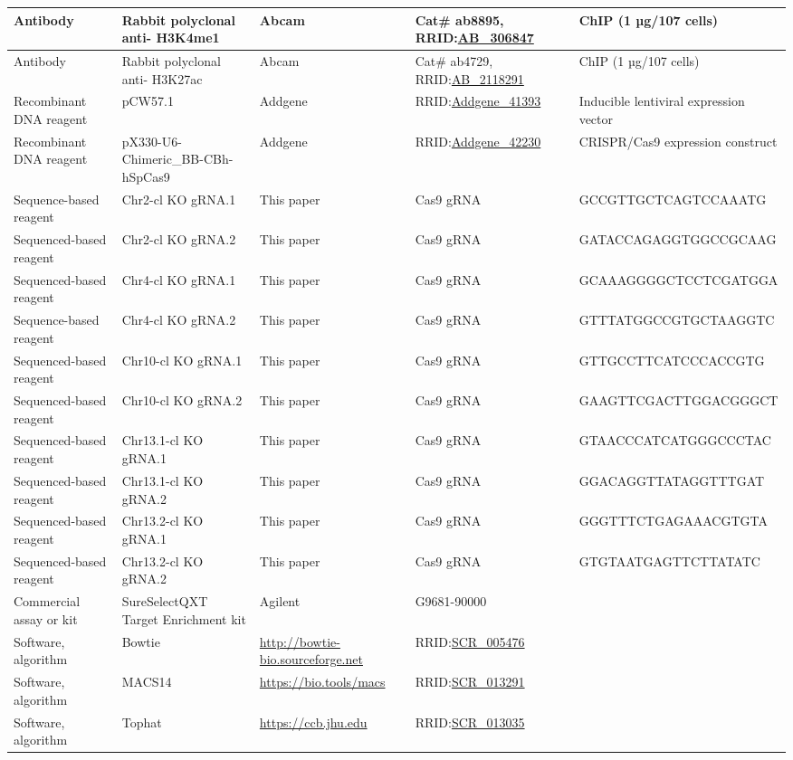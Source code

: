 \documentclass[11pt,a4paper]{article}
\begin{document}
\begin{table}[h]
\begin{tabular}{|l|l|l|l|l|}
Antibody & Rabbit polyclonal anti- H3K4me1 & Abcam & Cat\# ab8895, RRID:\href{https://scicrunch.org/resolver/AB\_306847}{AB\_306847} & ChIP (1 µg/107 cells) \\ \hline
Antibody & Rabbit polyclonal anti- H3K27ac & Abcam & Cat\# ab4729, RRID:\href{https://scicrunch.org/resolver/AB\_2118291}{AB\_2118291} & ChIP (1 µg/107 cells) \\ \hline
Recombinant DNA reagent & pCW57.1 & Addgene & RRID:\href{https://scicrunch.org/resolver/Addgene\_41393}{Addgene\_41393} & Inducible lentiviral expression vector \\ \hline
Recombinant DNA reagent & pX330-U6-Chimeric\_BB-CBh-hSpCas9 & Addgene & RRID:\href{https://scicrunch.org/resolver/Addgene\_42230}{Addgene\_42230} & CRISPR/Cas9 expression construct \\ \hline
Sequence-based reagent & Chr2-cl KO gRNA.1 & This paper & Cas9 gRNA & GCCGTTGCTCAGTCCAAATG \\ \hline
Sequenced-based reagent & Chr2-cl KO gRNA.2 & This paper & Cas9 gRNA & GATACCAGAGGTGGCCGCAAG \\ \hline
Sequenced-based reagent & Chr4-cl KO gRNA.1 & This paper & Cas9 gRNA & GCAAAGGGGCTCCTCGATGGA \\ \hline
Sequence-based reagent & Chr4-cl KO gRNA.2 & This paper & Cas9 gRNA & GTTTATGGCCGTGCTAAGGTC \\ \hline
Sequenced-based reagent & Chr10-cl KO gRNA.1 & This paper & Cas9 gRNA & GTTGCCTTCATCCCACCGTG \\ \hline
Sequenced-based reagent & Chr10-cl KO gRNA.2 & This paper & Cas9 gRNA & GAAGTTCGACTTGGACGGGCT \\ \hline
Sequenced-based reagent & Chr13.1-cl KO gRNA.1 & This paper & Cas9 gRNA & GTAACCCATCATGGGCCCTAC \\ \hline
Sequenced-based reagent & Chr13.1-cl KO gRNA.2 & This paper & Cas9 gRNA & GGACAGGTTATAGGTTTGAT \\ \hline
Sequenced-based reagent & Chr13.2-cl KO gRNA.1 & This paper & Cas9 gRNA & GGGTTTCTGAGAAACGTGTA \\ \hline
Sequenced-based reagent & Chr13.2-cl KO gRNA.2 & This paper & Cas9 gRNA & GTGTAATGAGTTCTTATATC \\ \hline
Commercial assay or kit & SureSelectQXT Target Enrichment kit & Agilent & G9681-90000 &  \\ \hline
Software, algorithm & Bowtie & \href{http://bowtie-bio.sourceforge.net/}{http://bowtie-bio.sourceforge.net} & RRID:\href{https://scicrunch.org/resolver/SCR\_005476}{SCR\_005476} &  \\ \hline
Software, algorithm & MACS14 & \href{https://bio.tools/macs}{https://bio.tools/macs} & RRID:\href{https://scicrunch.org/resolver/SCR\_013291}{SCR\_013291} &  \\ \hline
Software, algorithm & Tophat & \href{https://ccb.jhu.edu/}{https://ccb.jhu.edu} & RRID:\href{https://scicrunch.org/resolver/SCR\_013035}{SCR\_013035} &  \\ \hline
\end{tabular}
\end{table}
\end{document}

